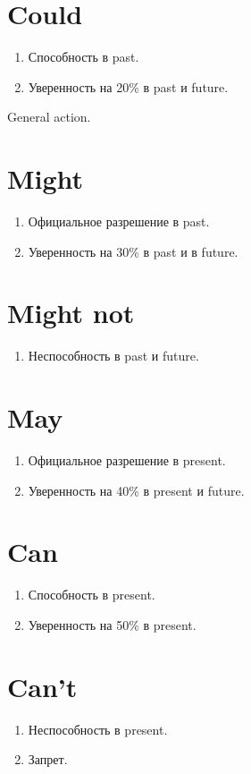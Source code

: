 \documentclass[oneside]{book}
\begin{document}
\section{Could}
\begin{enumerate}
    \item Способность в past.
    \item Уверенность на 20\% в past и future.
\end{enumerate}

General action.

\section{Might}
\begin{enumerate}
    \item Официальное разрешение в past.
    \item Уверенность на 30\% в past и в future.
\end{enumerate}

\section{Might not}
\begin{enumerate}
    \item Неспособность в past и future.
\end{enumerate}

\section{May}
\begin{enumerate}
    \item Официальное разрешение в present.
    \item Уверенность на 40\% в present и future.
\end{enumerate}

\section{Can}
\begin{enumerate}
    \item Способность в present.
    \item Уверенность на 50\% в present.
\end{enumerate}

\section{Can't}
\begin{enumerate}
    \item Неспособность в present.
    \item Запрет.
\end{enumerate}
\end{document}
